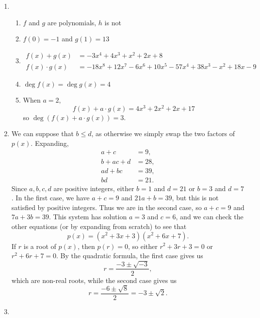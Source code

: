 \begin{enumerate}
\item \begin{enumerate}
\item $f$ and $g$ are polynomials, $h$ is not 
\item $f(0) = -1$ and $g(1) = 13$
\item \begin{align*}
f(x) + g(x) &= -3x^4 + 4x^3 + x^2 + 2x + 8 \\
f(x)\cdot g(x) &= -18x^8 + 12x^7 - 6x^6 + 10x^5 - 57x^4 + 38x^3 - x^2 + 18x - 9
\end{align*}
\item $\deg f(x) = \deg g(x) = 4$
\item When $a = 2$,
\begin{equation*}
f(x) + a\cdot g(x) = 4x^3 + 2x^2 + 2x + 17
\end{equation*}
so $\deg (f(x) + a\cdot g(x)) = 3$.
\end{enumerate}
\item We can suppose that $b\leq d$, as otherwise we simply swap the two factors of $p(x)$. Expanding,
\begin{align*}
a + c &= 9, \\
b + ac + d &= 28, \\
ad + bc &= 39, \\
bd &= 21.
\end{align*}
Since $a,b,c,d$ are positive integers, either $b = 1$ and $d = 21$ or $b = 3$ and $d = 7$. In the first case, we have $a + c = 9$ and $21a + b = 39$, but this is not satisfied by positive integers. Thus we are in the second case, so $a + c = 9$ and $7a + 3b = 39$. This system has solution $a = 3$ and $c = 6$, and we can check the other equations (or by expanding from scratch) to see that
\begin{equation*}
p(x) = (x^2 + 3x + 3)(x^2 + 6x + 7).
\end{equation*}
If $r$ is a root of $p(x)$, then $p(r) = 0$, so either $r^2 + 3r + 3 = 0$ or $r^2 + 6r + 7 = 0$. By the quadratic formula, the first case gives us
\begin{equation*}
r = \frac{-3\pm\sqrt{-3}}{2},
\end{equation*}
which are non-real roots, while the second case gives us
\begin{equation*}
r = \frac{-6\pm\sqrt{8}}{2} = \boxed{-3\pm\sqrt{2}}.
\end{equation*}
\item \begin{enumerate}

\end{enumerate}
\end{enumerate}
